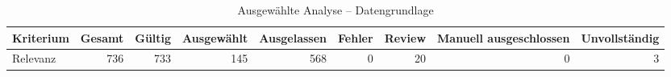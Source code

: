 \begin{table}[htbp]
\centering
\caption{Ausgewählte Analyse -- Datengrundlage}
\begin{tabular}{lrrrrrrrr}
\toprule
Kriterium & Gesamt & Gültig & Ausgewählt & Ausgelassen & Fehler & Review & Manuell ausgeschlossen & Unvollständig \\
\midrule
Relevanz & 736 & 733 & 145 & 568 & 0 & 20 & 0 & 3 \\
\bottomrule
\end{tabular}
\end{table}

